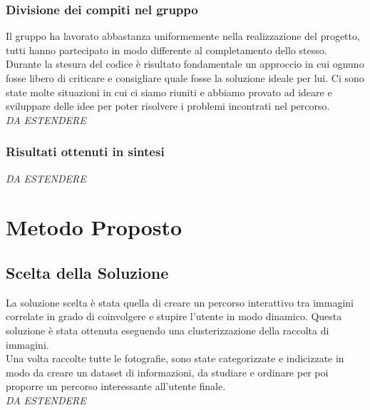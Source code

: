 \documentclass[12pt,a4paper,twoside]{article}
\begin{document}
\subsubsection*{Divisione dei compiti nel gruppo}
Il gruppo ha lavorato abbastanza uniformemente nella realizzazione del progetto, tutti hanno partecipato 
in modo differente al completamento dello stesso.\\
Durante la stesura del codice è risultato fondamentale un approccio in cui ognuno fosse libero di 
criticare e consigliare quale fosse la soluzione ideale per lui. Ci sono state molte situazioni in cui 
ci siamo riuniti e abbiamo provato ad ideare e sviluppare delle idee per poter risolvere i problemi 
incontrati nel percorso.\\
\textit{DA ESTENDERE}
\subsubsection*{Risultati ottenuti in sintesi}
\textit{DA ESTENDERE}


\newpage
\section{Metodo Proposto}

\subsection{Scelta della Soluzione}
La soluzione scelta è stata quella di creare un percorso interattivo tra immagini correlate in 
grado di coinvolgere e stupire l'utente in modo dinamico. Questa soluzione è stata ottenuta 
eseguendo una clusterizzazione della raccolta di immagini.\\
Una volta raccolte tutte le fotografie, sono state categorizzate e indicizzate in modo da creare 
un dataset di informazioni, da studiare e ordinare per poi proporre un percorso interessante 
all'utente finale.\\
\textit{DA ESTENDERE}
\end{document}
